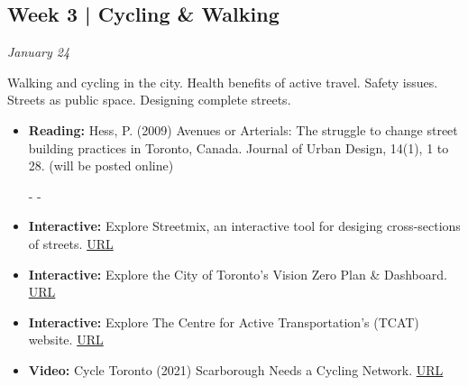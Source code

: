 \documentclass[11pt]{article}
\begin{document}



	
	


	\subsection*{Week 3 | Cycling \& Walking}
	
	\textit{January 24}
	
	Walking and cycling in the city. Health benefits of active travel. Safety issues. Streets as public space. Designing complete streets. 
	
	\begin{itemize}
		\item \textbf{Reading:} Hess, P. (2009) Avenues or Arterials: The struggle to change street building practices in Toronto, Canada. Journal of Urban Design, 14(1), 1 to 28. (will be posted online)
		
		- -
		
		\item \textbf{Interactive:} Explore Streetmix, an interactive tool for desiging cross-sections of streets. \href{https://streetmix.net}{URL}
		
		\item \textbf{Interactive:} Explore the City of Toronto's Vision Zero Plan \& Dashboard. \href{https://www.toronto.ca/services-payments/streets-parking-transportation/road-safety/vision-zero/vision-zero-dashboard/}{URL}
		
		\item \textbf{Interactive:} Explore The Centre for Active Transportation's (TCAT) website. \href{https://www.tcat.ca/}{URL}
		
		\item \textbf{Video:} Cycle Toronto (2021) Scarborough Needs a Cycling Network. \href{https://www.youtube.com/watch?v=gnwhc9fBa5k}{URL}
		
	\end{itemize}
	
\end{document}
